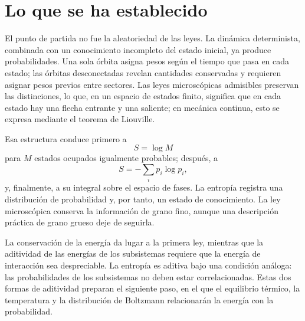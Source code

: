 \begin{classroomqa}
\end{classroomqa}

\section{Lo que se ha establecido}

El punto de partida no fue la aleatoriedad de las leyes. La dinámica determinista, combinada con un conocimiento incompleto del estado inicial, ya produce probabilidades. Una sola órbita asigna pesos según el tiempo que pasa en cada estado; las órbitas desconectadas revelan cantidades conservadas y requieren asignar pesos previos entre sectores. Las leyes microscópicas admisibles preservan las distinciones, lo que, en un espacio de estados finito, significa que en cada estado hay una flecha entrante y una saliente; en mecánica continua, esto se expresa mediante el teorema de Liouville.

Esa estructura conduce primero a
\begin{equation}
 S=\log M
\end{equation}
para \(M\) estados ocupados igualmente probables; después, a
\begin{equation}
 S=-\sum_i p_i\log p_i,
\end{equation}
y, finalmente, a su integral sobre el espacio de fases. La entropía registra una distribución de probabilidad y, por tanto, un estado de conocimiento. La ley microscópica conserva la información de grano fino, aunque una descripción práctica de grano grueso deje de seguirla.

La conservación de la energía da lugar a la primera ley, mientras que la aditividad de las energías de los subsistemas requiere que la energía de interacción sea despreciable. La entropía es aditiva bajo una condición análoga: las probabilidades de los subsistemas no deben estar correlacionadas. Estas dos formas de aditividad preparan el siguiente paso, en el que el equilibrio térmico, la temperatura y la distribución de Boltzmann relacionarán la energía con la probabilidad.
